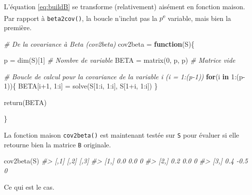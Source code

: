 \documentclass[
]{book}
\newenvironment{Shaded}{}{}
\newcommand{\CommentTok}[1]{\textit{#1}}
\newcommand{\ControlFlowTok}[1]{\textbf{#1}}
\newcommand{\DecValTok}[1]{#1}
\newcommand{\FunctionTok}[1]{#1}
\newcommand{\NormalTok}[1]{#1}
\newcommand{\OtherTok}[1]{#1}
\newcommand{\SpecialCharTok}[1]{#1}
\begin{document}
L'équation \eqref{eq:buildB} se transforme (relativement) aisément en fonction maison. Par rapport à \texttt{beta2cov()}, la boucle n'inclut pas la \(p\)\textsuperscript{e} variable, mais bien la première.

\begin{Shaded}
\begin{Highlighting}[]
\CommentTok{\# De la covariance à Beta (cov2beta)}
\NormalTok{cov2beta }\OtherTok{=} \ControlFlowTok{function}\NormalTok{(S)\{}
  
\NormalTok{  p }\OtherTok{=} \FunctionTok{dim}\NormalTok{(S)[}\DecValTok{1}\NormalTok{]          }\CommentTok{\# Nombre de variable}
\NormalTok{  BETA }\OtherTok{=} \FunctionTok{matrix}\NormalTok{(}\DecValTok{0}\NormalTok{, p, p) }\CommentTok{\# Matrice vide}
  
  \CommentTok{\# Boucle de calcul pour la covariance de la variable i (i = 1:(p{-}1))}
  \ControlFlowTok{for}\NormalTok{(i }\ControlFlowTok{in} \DecValTok{1}\SpecialCharTok{:}\NormalTok{(p}\DecValTok{{-}1}\NormalTok{))\{}
\NormalTok{    BETA[i}\SpecialCharTok{+}\DecValTok{1}\NormalTok{, }\DecValTok{1}\SpecialCharTok{:}\NormalTok{i] }\OtherTok{=} \FunctionTok{solve}\NormalTok{(S[}\DecValTok{1}\SpecialCharTok{:}\NormalTok{i, }\DecValTok{1}\SpecialCharTok{:}\NormalTok{i], S[}\DecValTok{1}\SpecialCharTok{+}\NormalTok{i, }\DecValTok{1}\SpecialCharTok{:}\NormalTok{i])}
\NormalTok{  \}}
  
  \FunctionTok{return}\NormalTok{(BETA)}
  
\NormalTok{\}}
\end{Highlighting}
\end{Shaded}

La fonction maison \texttt{cov2beta()} est maintenant testée sur \texttt{S} pour évaluer si elle retourne bien la matrice \texttt{B} originale.

\begin{Shaded}
\begin{Highlighting}[]
\FunctionTok{cov2beta}\NormalTok{(S)}
\CommentTok{\#\textgreater{}      [,1] [,2] [,3]}
\CommentTok{\#\textgreater{} [1,]  0.0  0.0    0}
\CommentTok{\#\textgreater{} [2,]  0.2  0.0    0}
\CommentTok{\#\textgreater{} [3,]  0.4 {-}0.5    0}
\end{Highlighting}
\end{Shaded}

Ce qui est le cas.
\end{document}
